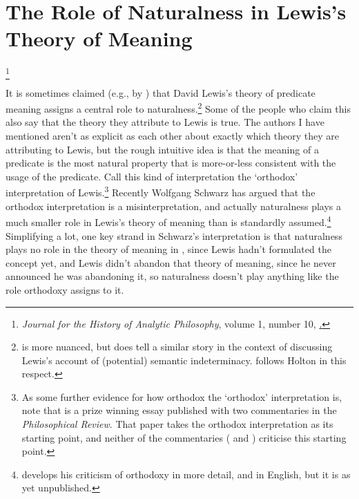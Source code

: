 
\chapter[Lewis, Naturalness and Meaning]{The Role of Naturalness in Lewis's Theory of Meaning }

\footnote{ \textit{Journal for the History of Analytic Philosophy}, volume 1, number 10, \href{http://jhaponline.org/index.php/jhap/article/view/14}.}

It is sometimes claimed (e.g., by \citet{Sider2001-SIDCOP, Sider4D, Stalnaker2004-JACLOI-2, Williams2007, Weatherson2003-WEAWGA}) that David Lewis's theory of predicate meaning assigns a central role to naturalness.\footnote{\citet{Holton2003Lewis} is more nuanced, but does tell a similar story in the context of discussing Lewis's account of (potential) semantic indeterminacy. \citet{Weatherson2010-VaI} follows Holton in this respect.} Some of the people who claim this also say that the theory they attribute to Lewis is true. The authors I have mentioned aren't as explicit as each other about exactly which theory they are attributing to Lewis, but the rough intuitive idea is that the meaning of a predicate is the most natural property that is more-or-less consistent with the usage of the predicate. Call this kind of interpretation the `orthodox' interpretation of Lewis.\footnote{As some further evidence for how orthodox the `orthodox' interpretation is, note that \citet{Williams2007} is a prize winning essay published with two commentaries in the \textit{Philosophical Review}. That paper takes the orthodox interpretation as its starting point, and neither of the commentaries (\citet{Bays2007} and \citet{Hawthorne2007}) criticise this starting point.}  Recently Wolfgang Schwarz \citeyearpar[209ff]{Schwarz2009} has argued that the orthodox interpretation is a misinterpretation, and actually naturalness plays a much smaller role in Lewis's theory of meaning than is standardly assumed.\footnote{\citet{Schwarz2006} develops his criticism of orthodoxy in more detail, and in English, but it is as yet unpublished.} Simplifying a lot, one key strand in Schwarz's interpretation is that naturalness plays no role in the theory of meaning in \citet{Lewis1969a, Lewis1975b}, since Lewis hadn't formulated the concept yet, and Lewis didn't abandon that theory of meaning, since he never announced he was abandoning it, so naturalness doesn't play anything like the role orthodoxy assigns to it.

